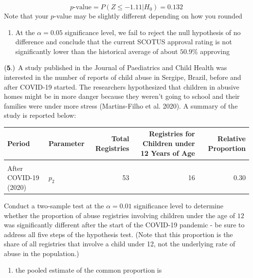 \documentclass[
]{article}
\providecommand{\tightlist}{%
  \setlength{\itemsep}{0pt}\setlength{\parskip}{0pt}}
\begin{document}
\[p\text{-value} = P(Z \leq -1.11| H_0) = 0.132\] Note that your
\(p\)-value may be slightly different depending on how you rounded

\begin{enumerate}
\def\labelenumi{\arabic{enumi}.}
\setcounter{enumi}{4}
\tightlist
\item
  {At the \(\alpha = 0.05\) significance level, we fail to reject the
  null hypothesis of no difference and conclude that the current SCOTUS
  approval rating is not significantly lower than the historical average
  of about \(50.9\%\) approving }
\end{enumerate}

\(\bf (5.)\) A study published in the Journal of Paediatrics and Child
Health was interested in the number of reports of child abuse in
Sergipe, Brazil, before and after COVID-19 started. The researchers
hypothesized that children in abusive homes might be in more danger
because they weren't going to school and their families were under more
stress (Martins-Filho et al. 2020). A summary of the study is reported
below:

\begin{table}[H]
\centering\centering
\begin{tabular}{llrrr}
\toprule
Period & Parameter & Total Registries & Registries for Children under 12 Years of Age & Relative Proportion\\
\midrule
\cellcolor{gray!10}{Before COVID-19 (2019)} & \cellcolor{gray!10}{$p_1$} & \cellcolor{gray!10}{70} & \cellcolor{gray!10}{18} & \cellcolor{gray!10}{0.26}\\
After COVID-19 (2020) & $p_2$ & 53 & 16 & 0.30\\
\bottomrule
\end{tabular}
\end{table}

Conduct a two-sample test at the \(\alpha = 0.01\) significance level to
determine whether the proportion of abuse registries involving children
under the age of \(12\) was significantly different after the start of
the COVID-19 pandemic - be sure to address all five steps of the
hypothesis test. (Note that this proportion is the share of all
registries that involve a child under 12, not the underlying rate of
abuse in the population.)

\begin{enumerate}
\def\labelenumi{\arabic{enumi}.}
\tightlist
\item
  the pooled estimate of the common proportion is
\end{enumerate}
\end{document}
